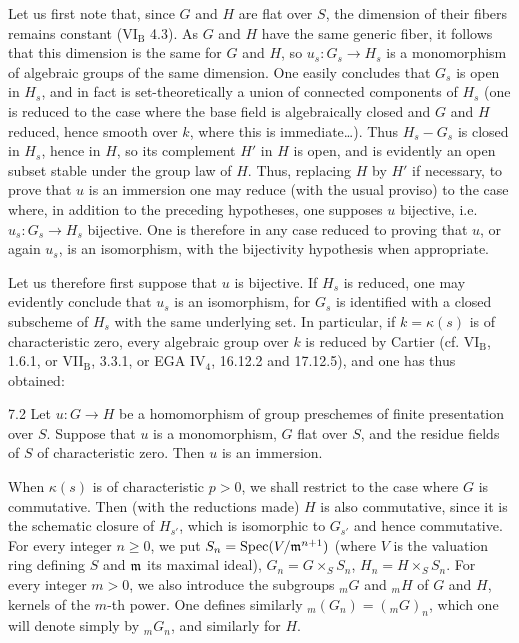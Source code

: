 Let us first note that, since $G$ and $H$ are flat over $S$, the dimension of their fibers remains constant (VI$_{\mathrm B}$ 4.3). As $G$ and $H$ have the same generic fiber, it follows that this dimension is the same for $G$ and $H$, so $u_s:G_s\to H_s$ is a monomorphism of algebraic groups of the same dimension. One easily concludes that $G_s$ is open in $H_s$, and in fact is set-theoretically a union of connected components of $H_s$ (one is reduced to the case where the base field is algebraically closed and $G$ and $H$ reduced, hence smooth over $k$, where this is immediate\dots). Thus $H_s-G_s$ is closed in $H_s$, hence in $H$, so its complement $H'$ in $H$ is open, and is evidently an open subset stable under the group law of $H$. Thus, replacing $H$ by $H'$ if necessary, to prove that $u$ is an immersion one may reduce (with the usual proviso) to the case where, in addition to the preceding hypotheses, one supposes $u$ bijective, i.e. $u_s:G_s\to H_s$ bijective. One is therefore in any case reduced to proving that $u$, or again $u_s$, is an isomorphism, with the bijectivity hypothesis when appropriate.

Let us therefore first suppose that $u$ is bijective. If $H_s$ is reduced, one may evidently conclude that $u_s$ is an isomorphism, for $G_s$ is identified with a closed subscheme of $H_s$ with the same underlying set. In particular, if $k=\kappa(s)$ is of characteristic zero, every algebraic group over $k$ is reduced by Cartier (cf. VI$_{\mathrm B}$, 1.6.1, or VII$_{\mathrm B}$, 3.3.1, or EGA IV$_4$, 16.12.2 and 17.12.5), and one has thus obtained:
\begin{proposition}{7.2}\label{VIII.7.2}
Let $u:G\to H$ be a homomorphism of group preschemes of finite presentation over $S$. Suppose that $u$ is a monomorphism, $G$ flat over $S$, and the residue fields of $S$ of characteristic zero. Then $u$ is an immersion.
\end{proposition}
When $\kappa(s)$ is of characteristic $p>0$, we shall restrict to the case where $G$ is commutative. Then (with the reductions made) $H$ is also commutative, since it is the schematic closure of $H_{s'}$, which is isomorphic to $G_{s'}$ and hence commutative. For every integer $n\geq0$, we put $S_n=\operatorname{Spec}(V/\mathfrak m^{n+1})$ (where $V$ is the valuation ring defining $S$ and $\mathfrak m$ its maximal ideal), $G_n=G\times_S S_n$, $H_n=H\times_S S_n$. For every integer $m>0$, we also introduce the subgroups ${}_mG$ and ${}_mH$ of $G$ and $H$, kernels of the $m$-th power. One defines similarly ${}_m(G_n)=({}_mG)_n$, which one will denote simply by ${}_mG_n$, and similarly for $H$.

